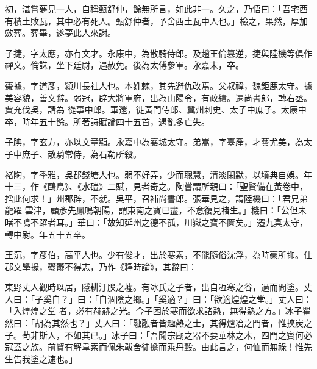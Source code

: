 \begin{pinyinscope}
 初，湛嘗夢見一人，自稱甄舒仲，餘無所言，如此非一。久之，乃悟曰：「吾宅西有積土敗瓦，其中必有死人。甄舒仲者，予舍西土瓦中人也。」檢之，果然，厚加斂葬。葬畢，遂夢此人來謝。



 子捷，字太應，亦有文才。永康中，為散騎侍郎。及趙王倫篡逆，捷與陸機等俱作禪文。倫誅，坐下廷尉，遇赦免。後為太傅參軍。永嘉末，卒。



 棗據，字道彥，潁川長社人也。本姓棘，其先避仇改焉。父叔禕，魏鉅鹿太守。據美容貌，善文辭。弱冠，辟大將軍府，出為山陽令，有政績。遷尚書郎，轉右丞。賈充伐吳，請為
 從事中郎。軍還，徙黃門侍郎、冀州刺史、太子中庶子。太康中卒，時年五十餘。所著詩賦論四十五首，遇亂多亡失。



 子腆，字玄方，亦以文章顯。永嘉中為襄城太守。弟嵩，字臺產，才藝尤美，為太子中庶子、散騎常侍，為石勒所殺。



 褚陶，字季雅，吳郡錢塘人也。弱不好弄，少而聰慧，清淡閑默，以墳典自娛。年十三，作《鷗鳥》、《水磑》二賦，見者奇之。陶嘗謂所親曰：「聖賢備在黃卷中，捨此何求！」州郡辟，不就。吳平，召補尚書郎。張華見之，謂陸機曰：「君兄弟龍躍
 雲津，顧彥先鳳鳴朝陽，謂東南之寶已盡，不意復見褚生。」機曰：「公但未睹不鳴不躍者耳。」華曰：「故知延州之德不孤，川嶽之寶不匱矣。」遷九真太守，轉中尉。年五十五卒。



 王沉，字彥伯，高平人也。少有俊才，出於寒素，不能隨俗沈浮，為時豪所抑。仕郡文學掾，鬱鬱不得志，乃作《釋時論》，其辭曰：



 東野丈人觀時以居，隱耕汙腴之墟。有冰氏之子者，出自冱寒之谷，過而問塗。丈人曰：「子奚自？」曰：「自涸陰之鄉。」「奚適？」曰：「欲適煌煌之堂。」丈人曰：「入煌煌之堂
 者，必有赫赫之光。今子困於寒而欲求諸熱，無得熱之方。」冰子瞿然曰：「胡為其然也？」丈人曰：「融融者皆趣熱之士，其得爐冶之門者，惟挾炭之子。茍非斯人，不如其已。」冰子曰：「吾聞宗廟之器不要華林之木，四門之賓何必冠蓋之族。前賢有解韋索而佩朱韍舍徒擔而乘丹轂。由此言之，何恤而無祿！惟先生告我塗之速也。」




\end{pinyinscope}
